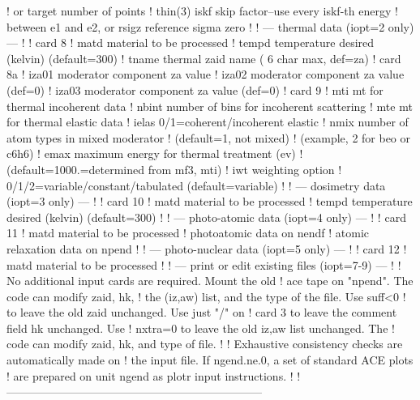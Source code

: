 \begin{ccode}
   !             or target number of points
   !    thin(3)  iskf skip factor--use every iskf-th energy
   !             between e1 and e2, or rsigz reference sigma zero
   !
   !   --- thermal data (iopt=2 only) ---
   !
   ! card 8
   !    matd     material to be processed
   !    tempd    temperature desired (kelvin) (default=300)
   !    tname    thermal zaid name ( 6 char max, def=za)
   ! card 8a
   !    iza01    moderator component za value
   !    iza02    moderator component za value (def=0)
   !    iza03    moderator component za value (def=0)
   ! card 9
   !    mti      mt for thermal incoherent data
   !    nbint    number of bins for incoherent scattering
   !    mte      mt for thermal elastic data
   !    ielas    0/1=coherent/incoherent elastic
   !    nmix     number of atom types in mixed moderator
   !             (default=1, not mixed)
   !             (example, 2 for beo or c6h6)
   !    emax     maximum energy for thermal treatment (ev)
   !             (default=1000.=determined from mf3, mti)
   !    iwt      weighting option
   !             0/1/2=variable/constant/tabulated (default=variable)
   !
   !   --- dosimetry data (iopt=3 only) ---
   !
   ! card 10
   !    matd     material to be processed
   !    tempd    temperature desired (kelvin) (default=300)
   !
   !   --- photo-atomic data (iopt=4 only) ---
   !
   ! card 11
   !    matd     material to be processed
   !             photoatomic data on nendf
   !             atomic relaxation data on npend
   !
   !   --- photo-nuclear data (iopt=5 only) ---
   !
   ! card 12
   !    matd     material to be processed
   !
   !   --- print or edit existing files (iopt=7-9) ---
   !
   !    No additional input cards are required.  Mount the old
   !    ace tape on "npend".  The code can modify zaid, hk,
   !    the (iz,aw) list, and the type of the file.  Use suff<0
   !    to leave the old zaid unchanged.  Use just "/" on
   !    card 3 to leave the comment field hk unchanged.  Use
   !    nxtra=0 to leave the old iz,aw list unchanged.  The
   !    code can modify zaid, hk, and type of file.
   !
   !    Exhaustive consistency checks are automatically made on
   !    the input file.  If ngend.ne.0, a set of standard ACE plots
   !    are prepared on unit ngend as plotr input instructions.
   !
   !--------------------------------------------------------------------

\end{ccode}
\normalsize

